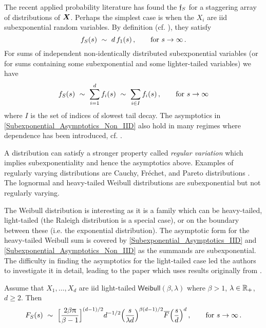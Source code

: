 The recent applied probability literature has found the $\mathfrak{f}_S$ for a staggering array of distributions of $\bm{X}$. Perhaps the simplest case is when the $X_i$ are iid subexponential random variables. By definition (cf. \cite{foss2011introduction}), they satisfy
\begin{equation} \label{Subexponential_Asymptotics_IID}
f_S(s)\ \sim\ d \, f_1(s) \,,\qquad \text{for } s \to \infty\,.
\end{equation}
For sums of independent non-identically distributed subexponential variables (or for sums containing some subexponential and some lighter-tailed variables) we have
\begin{equation} \label{Subexponential_Asymptotics_Non_IID}
f_S(s)\ \sim\ \sum_{i=1}^d f_i(s)\ \sim\ \sum_{i\in I} f_i(s) \,,\qquad \text{for } s \to \infty
\end{equation}
where $I$ is the set of indices of slowest tail decay. The asymptotics in \eqref{Subexponential_Asymptotics_Non_IID} also hold in many regimes where dependence has been introduced, cf. \cite{foss2010sums,wuthrich2003asymptotic,alink2004diversification,alink2007diversification}.

A distribution can satisfy a stronger property called \emph{regular variation} which implies subexponentiality and hence the asymptotics above. Examples of regularly varying distributions are Cauchy, Fr\'{e}chet, and Pareto distributions \cite{bingham1989regular}. The lognormal and heavy-tailed Weibull distributions are subexponential but not regularly varying.

The Weibull distribution is interesting as it is a family which can be heavy-tailed, light-tailed (the Raleigh distribution is a special case), or on the boundary between these (i.e. the exponential distribution). The asymptotic form for the heavy-tailed Weibull sum is covered by \eqref{Subexponential_Asymptotics_IID} and \eqref{Subexponential_Asymptotics_Non_IID} as the summands are subexponential. The difficulty in finding the asymptotics for the light-tailed case led the authors to investigate it in detail, leading to the paper \cite{asmussen2017tail} which uses results originally from \cite{balkema1993densities}.

\begin{proposition} \label{prop:light_weibull} Assume that $X_1, \dots, X_d$ are iid light-tailed $\mathsf{Weibull}(\beta, \lambda)$ where $\beta>1$, $\lambda \in \mathbb{R}_+$, $d \ge 2$. Then
\begin{equation*}
F_S(s)\ \sim\ \Bigl[ \frac{2\beta\pi}{\beta-1}\Bigr]^{(d-1)/2} d^{-1/2} \Big( \frac{s}{\lambda d} \Big)^{\beta(d-1)/2} \Ftail \Big( \frac{s}{d} \Big)^d \for{s \to \infty}\,.
\end{equation*}
\end{proposition}

